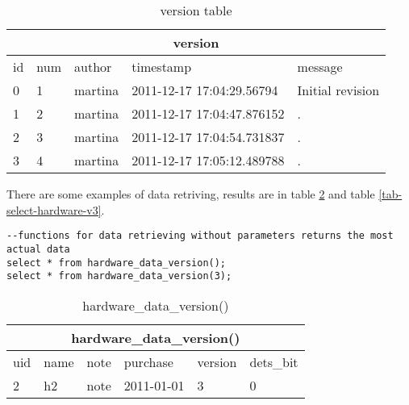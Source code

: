 \documentclass[deska]{subfiles}
\begin{document}
\begin{center}

\begin{table}
    \caption{version table}
    \label{tab-example-version}
\begin{tabular}{ | l | l | l | l | l |}
    \hline
    \multicolumn{5}{|c|}{version}\\
    \hline
    id & num & author & timestamp & message\\
    \hline
    0 & 1 & martina & 2011-12-17 17:04:29.56794 & Initial revision\\
    1 & 2 & martina & 2011-12-17 17:04:47.876152 & .\\
    2 & 3 & martina & 2011-12-17 17:04:54.731837 & .\\
    3 & 4 & martina & 2011-12-17 17:05:12.489788 & .\\
    \hline
\end{tabular}
\end{table}

\end{center}


There are some examples of data retriving, results are in table \ref{tab-select-hardware} and table \ref{tab-select-hardware-v3}.\\

\begin{verbatim}
--functions for data retrieving without parameters returns the most actual data
select * from hardware_data_version();
select * from hardware_data_version(3);
\end{verbatim}

\begin{center}

\begin{table}
    \caption{hardware\_data\_version()}
    \label{tab-select-hardware}
\begin{tabular}{ | l | l | l | l | l | l |}
    \hline
    \multicolumn{6}{|c|}{hardware\_data\_version()}\\
    \hline
    uid & name & note & purchase & version & dets\_bit\\
    \hline
    2 & h2 & note & 2011-01-01 & 3 & 0\\
    \hline
\end{tabular}
\end{table}

\end{center}
\end{document}
